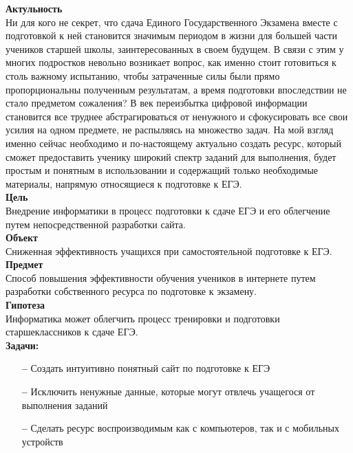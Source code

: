 \documentclass[a4paper, 12pt]{extarticle}
\begin{document}
\vspace{2mm}
\textbf{Актульность}
\vspace{2mm}
\\
Ни для кого не секрет, что сдача Единого Государственного Экзамена вместе с
подготовкой к ней становится значимым периодом в жизни для большей части
учеников старшей школы, заинтересованных в своем будущем. В связи с этим у
многих подростков невольно возникает вопрос, как именно стоит готовиться к
столь важному испытанию, чтобы затраченные силы были прямо пропорциональны
полученным результатам, а время подготовки впоследствии не стало предметом
сожаления?  В век переизбытка цифровой информации становится все труднее
абстрагироваться от ненужного и сфокусировать все свои усилия на одном
предмете, не распыляясь на множество задач. На мой взгляд именно сейчас
необходимо и по-настоящему актуально создать ресурс, который сможет
предоставить ученику широкий спектр заданий для выполнения, будет простым и
понятным в использовании и содержащий только необходимые материалы, напрямую относящиеся к подготовке к ЕГЭ.
\\

\vspace{2mm}
\textbf{Цель}
\vspace{2mm}
\\
Внедрение информатики в процесс подготовки к
сдаче ЕГЭ и его облегчение путем непосредственной разработки сайта.
\\

\vspace{2mm}
\textbf{Объект}
\vspace{2mm}
\\
Сниженная эффективность учащихся при самостоятельной подготовке к ЕГЭ.
\\

\vspace{2mm}
\textbf{Предмет}
\vspace{2mm}
\\
Способ повышения эффективности обучения учеников в интернете
путем разработки собственного ресурса по подготовке к экзамену.
\\

\vspace{2mm}
\textbf{Гипотеза}
\vspace{2mm}
\\
Информатика может облегчить процесс тренировки и подготовки
старшеклассников к сдаче ЕГЭ.
\\

\vspace{2mm}
\textbf{Задачи:}
\begin{itemize}
    \item[\bfseries--] Создать интуитивно понятный сайт по подготовке к ЕГЭ
    \item[\bfseries--] Исключить ненужные данные, которые могут отвлечь
        учащегося от выполнения заданий
    \item[\bfseries--] Сделать ресурс воспроизводимым как с компьютеров, так и
        с мобильных устройств
\end{itemize}
\end{document}
